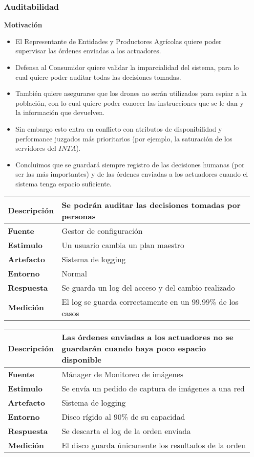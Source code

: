\subsubsection{Auditabilidad}
\textbf{Motivación}
\begin{itemize}
 \item El Representante de Entidades y Productores Agr\'icolas quiere poder supervisar las órdenes enviadas a los actuadores.
 \item Defensa al Consumidor quiere validar la imparcialidad del sistema, para lo cual quiere poder auditar todas las decisiones tomadas.
 \item También quiere asegurarse que los drones no serán utilizados para espiar a la población, con lo cual quiere poder conocer las instrucciones que se le dan y la información que devuelven.
 \item Sin embargo esto entra en conflicto con atributos de disponibilidad y performance juzgados más prioritarios (por ejemplo, la saturación de los servidores del $INTA$).
 \item Concluimos que se guardará siempre registro de las decisiones humanas (por ser las más importantes) y de las órdenes enviadas a los actuadores cuando el sistema tenga espacio suficiente.
\end{itemize}

\begin{tabular}{| l || p{12cm} |}
\hline 
\textbf{Descripci\'on} & Se podrán auditar las decisiones tomadas por personas \\
\hline 
\textbf{Fuente} & Gestor de configuración \\
\hline 
\textbf{Estimulo} & Un usuario cambia un plan maestro \\
\hline 
\textbf{Artefacto} & Sistema de logging \\
\hline 
\textbf{Entorno} & Normal \\
\hline 
\textbf{Respuesta} & Se guarda un log del acceso y del cambio realizado \\
\hline 
\textbf{Medici\'on} & El log se guarda correctamente en un 99,99\% de los casos \\
\hline 
\end{tabular}

\medskip

\begin{tabular}{| l || p{12cm} |}
\hline 
\textbf{Descripci\'on} & Las órdenes enviadas a los actuadores no se guardarán cuando haya poco espacio disponible \\
\hline 
\textbf{Fuente} & Mánager de Monitoreo de imágenes \\
\hline 
\textbf{Estimulo} & Se envía un pedido de captura de imágenes a una red \\
\hline 
\textbf{Artefacto} & Sistema de logging \\
\hline 
\textbf{Entorno} & Disco rígido al 90\% de su capacidad \\
\hline 
\textbf{Respuesta} & Se descarta el log de la orden enviada \\
\hline 
\textbf{Medici\'on} & El disco guarda únicamente los resultados de la orden \\
\hline 
\end{tabular}


